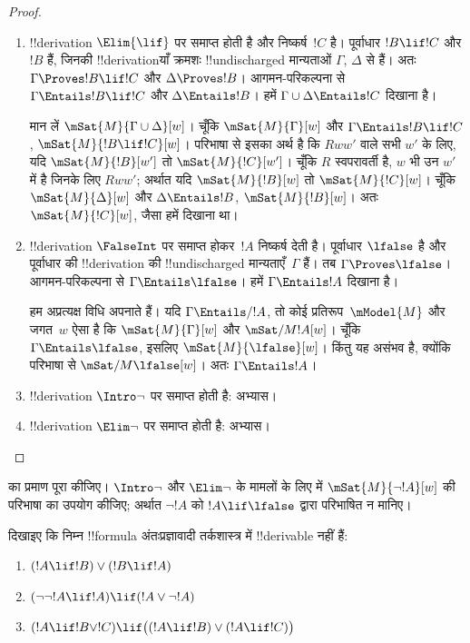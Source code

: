 \documentclass[../../../include/open-logic-section]{subfiles}
\begin{document}
\begin{proof}
\begin{enumerate}
  \item !!{derivation} $\Elim{\lif}$ पर समाप्त होती है और निष्कर्ष~$!C$
    है। पूर्वाधार $!B \lif !C$ और $!B$ हैं, जिनकी !!{derivation}याँ
    क्रमशः !!{undischarged} मान्यताओं $\Gamma$, $\Delta$ से हैं। अतः
    $\Gamma \Proves !B \lif !C$ और $\Delta \Proves !B$।
    आगमन-परिकल्पना से $\Gamma \Entails !B \lif !C$ और
    $\Delta \Entails !B$। हमें $\Gamma \cup \Delta \Entails !C$ दिखाना
    है।

    मान लें $\mSat{M}{\Gamma \cup \Delta}[w]$। चूँकि
    $\mSat{M}{\Gamma}[w]$ और $\Gamma \Entails !B \lif !C$,
    $\mSat{M}{!B \lif !C}[w]$। परिभाषा से इसका अर्थ है कि $Rww'$ वाले सभी
    $w'$ के लिए, यदि $\mSat{M}{!B}[w']$ तो $\mSat{M}{!C}[w']$। चूँकि $R$
    स्वपरावर्ती है, $w$ भी उन $w'$ में है जिनके लिए $Rww'$; अर्थात यदि
    $\mSat{M}{!B}[w]$ तो $\mSat{M}{!C}[w]$। चूँकि
    $\mSat{M}{\Delta}[w]$ और $\Delta \Entails !B$,
    $\mSat{M}{!B}[w]$। अतः $\mSat{M}{!C}[w]$, जैसा हमें दिखाना था।

  \item !!{derivation} $\FalseInt$ पर समाप्त होकर~$!A$ निष्कर्ष देती है।
    पूर्वाधार $\lfalse$ है और पूर्वाधार की !!{derivation} की
    !!{undischarged} मान्यताएँ~$\Gamma$ हैं। तब
    $\Gamma \Proves \lfalse$। आगमन-परिकल्पना से
    $\Gamma \Entails \lfalse$। हमें $\Gamma \Entails !A$ दिखाना है।

    हम अप्रत्यक्ष विधि अपनाते हैं। यदि $\Gamma \Entails/ !A$, तो कोई
    प्रतिरूप~$\mModel{M}$ और जगत~$w$ ऐसा है कि
    $\mSat{M}{\Gamma}[w]$ और $\mSat/{M}{!A}[w]$। चूँकि
    $\Gamma \Entails \lfalse$, इसलिए $\mSat{M}{\lfalse}[w]$। किंतु यह
    असंभव है, क्योंकि परिभाषा से $\mSat/{M}{\lfalse}[w]$। अतः
    $\Gamma \Entails !A$।
  \item !!{derivation} $\Intro\lnot$ पर समाप्त होती है: अभ्यास।
  \item !!{derivation} $\Elim\lnot$ पर समाप्त होती है: अभ्यास।
  \end{enumerate}
\end{proof}

\begin{prob}
   का प्रमाण पूरा कीजिए।
  $\Intro\lnot$ और $\Elim\lnot$ के मामलों के लिए
   में $\mSat{M}{\lnot !A}[w]$ की
  परिभाषा का उपयोग कीजिए; अर्थात $\lnot !A$ को $!A \lif \lfalse$ द्वारा
  परिभाषित न मानिए।
\end{prob}

\begin{prob}
  दिखाइए कि निम्न !!{formula} अंतःप्रज्ञावादी तर्कशास्त्र में !!{derivable}
  नहीं हैं:
  \begin{enumerate}
    \item $(!A \lif !B) \lor (!B \lif !A)$
    \item $(\lnot\lnot !A \lif !A) \lif (!A \lor \lnot !A)$
    \item $(!A \lif !B \lor !C) \lif \bigl((!A \lif !B)\lor(!A \lif !C)\bigr)$
  \end{enumerate}
\end{prob}
\end{document}

